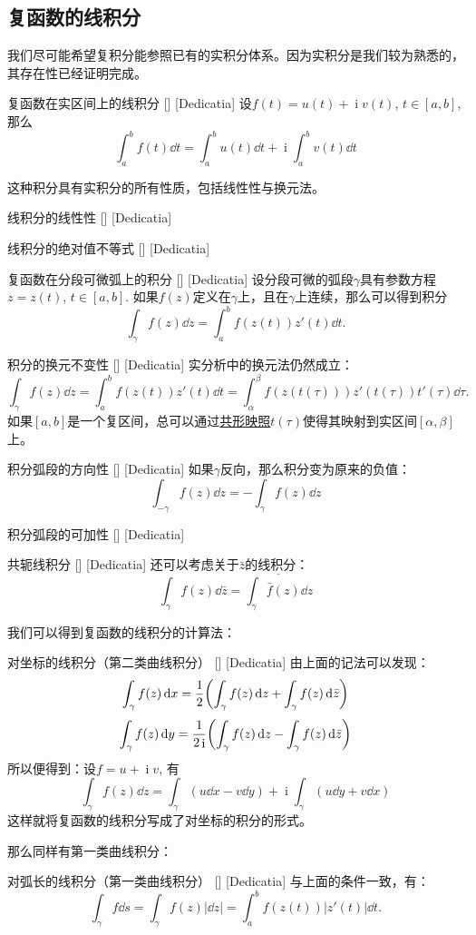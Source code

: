 \documentclass[UTF8]{ctexart}
\DeclareMathOperator{\ii}{\mathrm{i}}
\newcommand{\ConformalMapping}{\hyperref[dfn:ConformalMapping]{共形映照}}
\begin{document}
\subsection{复函数的线积分}
我们尽可能希望复积分能参照已有的实积分体系。因为实积分是我们较为熟悉的，其存在性已经证明完成。
\begin{dfn}
    [UUID]
    {复函数在实区间上的线积分}
    []
    [Dedicatia]
    设$f(t)=u(t)+\ii v(t)$, $t\in[a,b]$, 那么
    \[\int_{a}^{b}f(t)\dd{t}=\int_{a}^{b}u(t)\dd{t}+\ii\int_{a}^{b}v(t)\dd{t}\]
\end{dfn}
这种积分具有实积分的所有性质，包括线性性与换元法。
\begin{ppt}
    [UUID]
    {线积分的线性性}
    []
    [Dedicatia]
\end{ppt}
\begin{ppt}
    [UUID]
    {线积分的绝对值不等式}
    []
    [Dedicatia]
\end{ppt}
\begin{crl}
    [UUID]
    {复函数在分段可微弧上的积分}
    []
    [Dedicatia]
    设分段可微的弧段$\gamma$具有参数方程$z=z(t)$, $t\in[a,b]$. 如果$f(z)$定义在$\gamma$上，且在$\gamma$上连续，那么可以得到积分
    \[\int_\gamma f(z)\dd{z}=\int_{a}^{b}f(z(t))z'(t)\dd{t}.\]
\end{crl}
\begin{ppt}
    [UUID]
    {积分的换元不变性}
    []
    [Dedicatia]
    实分析中的换元法仍然成立：
    \[\int_\gamma f(z)\dd{z}=\int_{a}^{b}f(z(t))z'(t)\dd{t}=\int_{\alpha}^{\beta}f(z(t(\tau)))z'(t(\tau))t'(\tau)\dd{\tau}.\]
    如果$[a,b]$是一个复区间，总可以通过\ConformalMapping $t(\tau)$使得其映射到实区间$[\alpha,\beta]$上。
\end{ppt}
\begin{ppt}
    [UUID]
    {积分弧段的方向性}
    []
    [Dedicatia]
    如果$\gamma$反向，那么积分变为原来的负值：
    \[\int_{-\gamma} f(z)\dd{z}=-\int_\gamma f(z)\dd{z}\]
\end{ppt}
\begin{ppt}
    [UUID]
    {积分弧段的可加性}
    []
    [Dedicatia]
\end{ppt}
\begin{ppt}
    [UUID]
    {共轭线积分}
    []
    [Dedicatia]
    还可以考虑关于$\bar{z}$的线积分：
    \[\int_\gamma f(z)\dd{\bar{z}}=\overline{\int_\gamma \bar{f}(z)\dd{z}}\]
\end{ppt}
我们可以得到复函数的线积分的计算法：
\begin{ppt}
    [UUID]
    {对坐标的线积分（第二类曲线积分）}
    []
    [Dedicatia]
    由上面的记法可以发现：
    \[\int_\gamma f(z)\dd{x}=\frac{1}{2}\qty(\int_\gamma f(z)\dd{z}+\int_\gamma f(z)\dd{\bar{z}})\]
    \[\int_\gamma f(z)\dd{y}=\frac{1}{2\ii}\qty(\int_\gamma f(z)\dd{z}-\int_\gamma f(z)\dd{\bar{z}})\]
    所以便得到：设$f=u+\ii v$, 有
    \[\int_\gamma f(z)\dd{z}=\int_\gamma(u\dd{x}-v\dd{y})+\ii\int_\gamma(u\dd{y}+v\dd{x})\]
    这样就将复函数的线积分写成了对坐标的积分的形式。
\end{ppt}
那么同样有第一类曲线积分：
\begin{ppt}
    [UUID]
    {对弧长的线积分（第一类曲线积分）}
    []
    [Dedicatia]
    与上面的条件一致，有：
    \[\int_\gamma f\dd{s}=\int_\gamma f(z)|\dd{z}|=\int_{a}^b f(z(t))|z'(t)|\dd{t}.\]
\end{ppt}
\end{document}
